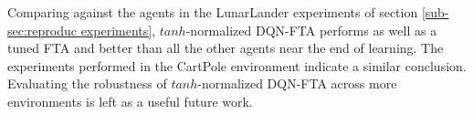 \documentclass{article}
\begin{document}
Comparing against the agents in the LunarLander experiments of section \ref{sub-sec:reproduc experiments}, $tanh$-normalized DQN-FTA performs as well as a tuned FTA and better than all the other agents near the end of learning.
The experiments performed in the CartPole environment indicate a similar conclusion. 
Evaluating the robustness of $tanh$-normalized DQN-FTA across more environments is left as a useful future work.


\newpage

\end{document}
